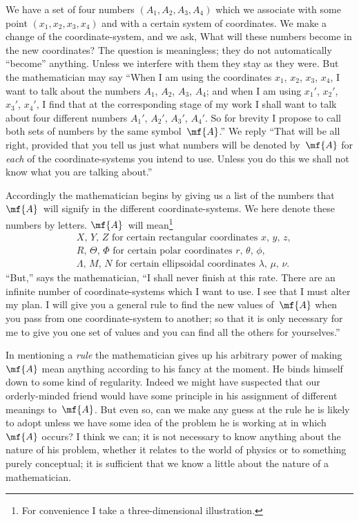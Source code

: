 \documentclass[12pt]{book}
\begin{document}
We have a set of four numbers $(A_{1}, A_{2}, A_{3}, A_{4})$ which we associate with
some point $(x_{1}, x_{2}, x_{3}, x_{4})$ and with a certain system of coordinates. We make
a change of the coordinate\hyp{}system, and we ask, What will these numbers
become in the new coordinates? The question is meaningless; they do not
automatically ``become'' anything. Unless we interfere with them they stay
as they were. But the mathematician may say ``When I am using the
coordinates $x_{1}$, $x_{2}$, $x_{3}$, $x_{4}$, I want to talk about the numbers $A_{1}$, $A_{2}$, $A_{3}$, $A_{4}$;
and when I am using $x_{1}'$, $x_{2}'$, $x_{3}'$, $x_{4}'$, I find that at the corresponding stage of
my work I shall want to talk about four different numbers $A_{1}'$, $A_{2}'$, $A_{3}'$, $A_{4}'$.
So for brevity I propose to call both sets of numbers by the same symbol~$\mf{A}$.''
We reply ``That will be all right, provided that you tell us just what numbers
will be denoted by~$\mf{A}$ for \emph{each} of the coordinate\hyp{}systems you intend to use.
Unless you do this we shall not know what you are talking about.''

Accordingly the mathematician begins by giving us a list of the numbers
that $\mf{A}$~will signify in the different coordinate\hyp{}systems. We here denote these
numbers by letters. $\mf{A}$~will mean\footnote
  {For convenience I take a three\hyp{}dimensional illustration.}
\begin{align*}
&\text{$X$, $Y$, $Z$ for certain rectangular coordinates $x$, $y$, $z$,} \\
&\text{$R$, $\Theta$, $\Phi$ for certain polar coordinates $r$, $\theta$, $\phi$,} \\
  &\text{$\Lambda$, $M$, $N$ for certain ellipsoidal coordinates $\lambda$, $\mu$, $\nu$.}
  \end{align*}
``But,'' says the mathematician, ``I shall never finish at this rate. There are
an infinite number of coordinate\hyp{}systems which I want to use. I see that
I must alter my plan. I will give you a general rule to find the new values
of~$\mf{A}$ when you pass from one coordinate\hyp{}system to another; so that it is only
necessary for me to give you one set of values and you can find all the others
for yourselves.''

In mentioning a \emph{rule} the mathematician gives up his arbitrary power of
making~$\mf{A}$ mean anything according to his fancy at the moment. He binds
himself down to some kind of regularity. Indeed we might have suspected
that our orderly\hyp{}minded friend would have some principle in his assignment
of different meanings to~$\mf{A}$. But even so, can we make any guess at the rule
he is likely to adopt unless we have some idea of the problem he is working
at in which~$\mf{A}$ occurs? I think we can; it is not necessary to know anything
about the nature of his problem, whether it relates to the world of physics or
to something purely conceptual; it is sufficient that we know a little about
the nature of a mathematician.
\end{document}
